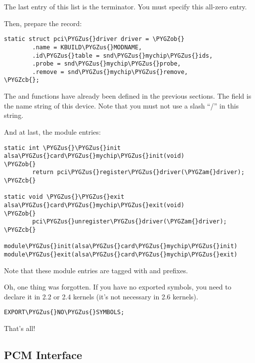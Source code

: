 \documentclass[a4paper,8pt,english]{sphinxmanual}
\def\PYGZus{\char`\_}
\def\PYGZob{\char`\{}
\def\PYGZcb{\char`\}}
\def\PYGZam{\char`\&}
\begin{document}
The last entry of this list is the terminator. You must specify this
all-zero entry.

Then, prepare the 
record:

\begin{Verbatim}[commandchars=\\\{\}]
static struct pci\PYGZus{}driver driver = \PYGZob{}
        .name = KBUILD\PYGZus{}MODNAME,
        .id\PYGZus{}table = snd\PYGZus{}mychip\PYGZus{}ids,
        .probe = snd\PYGZus{}mychip\PYGZus{}probe,
        .remove = snd\PYGZus{}mychip\PYGZus{}remove,
\PYGZcb{};
\end{Verbatim}

The  and  functions have already been defined in
the previous sections. The  field is the name string of this
device. Note that you must not use a slash “/” in this string.

And at last, the module entries:

\begin{Verbatim}[commandchars=\\\{\}]
static int \PYGZus{}\PYGZus{}init alsa\PYGZus{}card\PYGZus{}mychip\PYGZus{}init(void)
\PYGZob{}
        return pci\PYGZus{}register\PYGZus{}driver(\PYGZam{}driver);
\PYGZcb{}

static void \PYGZus{}\PYGZus{}exit alsa\PYGZus{}card\PYGZus{}mychip\PYGZus{}exit(void)
\PYGZob{}
        pci\PYGZus{}unregister\PYGZus{}driver(\PYGZam{}driver);
\PYGZcb{}

module\PYGZus{}init(alsa\PYGZus{}card\PYGZus{}mychip\PYGZus{}init)
module\PYGZus{}exit(alsa\PYGZus{}card\PYGZus{}mychip\PYGZus{}exit)
\end{Verbatim}

Note that these module entries are tagged with  and 
prefixes.

Oh, one thing was forgotten. If you have no exported symbols, you need
to declare it in 2.2 or 2.4 kernels (it's not necessary in 2.6 kernels).

\begin{Verbatim}[commandchars=\\\{\}]
EXPORT\PYGZus{}NO\PYGZus{}SYMBOLS;
\end{Verbatim}

That's all!


\subsection{PCM Interface}
\label{sound/kernel-api/writing-an-alsa-driver:pcm-interface}
\end{document}
